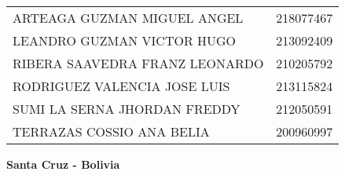 \documentclass[a4paper]{article} %
\newcommand{\logoqr}{img/qr.png}
\begin{document}
\begin{titlepage}
\begin{minipage}{0.79\textwidth}
\begin{flushleft}
\begin{longtable}[c]{|l|c|}
                    
                    \hline
                                            {ARTEAGA GUZMAN MIGUEL ANGEL} &     {218077467} \\
                    \rowcolor{lightblue}    {LEANDRO GUZMAN VICTOR HUGO } &     {213092409} \\
                                            {RIBERA SAAVEDRA FRANZ LEONARDO} &  {210205792} \\
                    \rowcolor{lightblue}    {RODRIGUEZ VALENCIA JOSE LUIS} &    {213115824} \\
                                            {SUMI LA SERNA JHORDAN FREDDY} &    {212050591} \\
                    \rowcolor{lightblue}    {TERRAZAS COSSIO ANA BELIA} &       {200960997} \\
                    
                    \hline

                    \end{longtable}
            \end{flushleft}
        \end{minipage}
        \hfill  %


        \vspace{1cm}  %
        \Large\textbf{Santa Cruz - Bolivia}\par

    \end{titlepage}

    \clearpage  %
    \begin{doublespace}     %
    \tableofcontents %
    \end{doublespace}
    \clearpage  %
\end{document}
